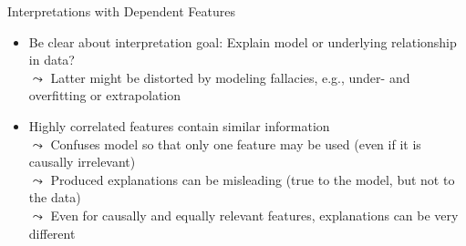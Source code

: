 \documentclass[11pt,compress,t,notes=noshow, aspectratio=169, xcolor=table]{beamer}
\begin{document}
\begin{frame}{Interpretations with Dependent Features}
\begin{itemize}

\item Be clear about interpretation goal: Explain model or underlying relationship in data?
\\
$\leadsto$ Latter might be distorted by modeling fallacies, 
e.g., 
under- and overfitting or extrapolation

\pause
\item Highly correlated features contain similar information \\
$\leadsto$ Confuses model so that only one feature may be used (even if it is causally irrelevant)
\\
$\leadsto$ Produced explanations can be misleading (true to the model, but not to the data) %
\\
$\leadsto$ Even for causally and equally relevant features, explanations can be very different


\pause



\end{itemize}
\end{frame}
\end{document}
